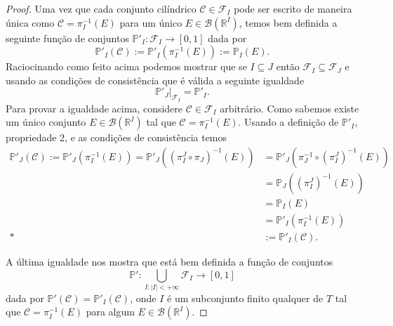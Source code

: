 \begin{proof}
Uma vez que cada conjunto cilíndrico $\mathcal{C}\in \mathcal{F}_{I}$
pode ser escrito de maneira única como $\mathcal{C} = \pi_{I}^{-1}(E)$
para um único $E\in\mathscr{B}(\mathbb{R}^I)$, temos bem definida 
a seguinte função de conjuntos $\mathbb{P}'_{I}:\mathcal{F}_{I}\to [0,1]$ 
dada por 
\[
\mathbb{P}'_{I}(\mathcal{C})
:= 
\mathbb{P}'_{I}(\pi_{I}^{-1}(E)) 
:= 
\mathbb{P}_{I}(E).
\]
Raciocinando como feito acima podemos mostrar que
se $I\subseteq J$ então $\mathcal{F}_{I}\subseteq \mathcal{F}_{J}$ e
usando as condições de consistência que é válida a seguinte igualdade 
\[
\mathbb{P}'_{J}\big|_{\mathcal{F}_{I}} = \mathbb{P}'_{I}.
\]
Para provar a igualdade acima, considere $\mathcal{C}\in\mathcal{F}_{I}$
arbitrário. Como sabemos existe um único conjunto 
$E\in \mathscr{B}(\mathbb{R}^I)$ tal que $\mathcal{C} = \pi_{I}^{-1}(E)$.
Usando a definição de $\mathbb{P}'_{I}$, propriedade 2, e as condições 
de consistência temos 
\begin{align*}
\mathbb{P}'_{J}(\mathcal{C})
:=
\mathbb{P}'_{J}(\pi_{I}^{-1}(E))
=
\mathbb{P}'_{J}(  (\pi_{I}^{J}\circ \pi_{J})  ^{-1}(E))
&=
\mathbb{P}'_{J}( \pi^{-1}_{J}\circ (\pi_{I}^{J})^{-1}(E))
\\
&=
\mathbb{P}_{J}( (\pi_{I}^{J})^{-1}(E))
\\
&=
\mathbb{P}_{I}(E)
\\
&=
\mathbb{P}'_{I}( \pi^{-1}_{I}(E))
\\*
&:=
\mathbb{P}'_{I}(\mathcal{C}).
\end{align*}



A última igualdade nos mostra que está bem definida a função 
de conjuntos 
\[ 
\mathbb{P}': \!\!\!\!
\bigcup_{I:|I|<+\infty}\!\!\!\! \mathcal{F}_{I}\to [0,1]
\]
dada por $\mathbb{P}'(\mathcal{C}) = \mathbb{P}'_{I}(\mathcal{C})$,
onde $I$ é um subconjunto finito qualquer de $T$ tal que 
$\mathcal{C}=\pi_{I}^{-1}(E)$ para algum $E\in \mathscr{B}(\mathbb{R}^I)$.



\end{proof}
